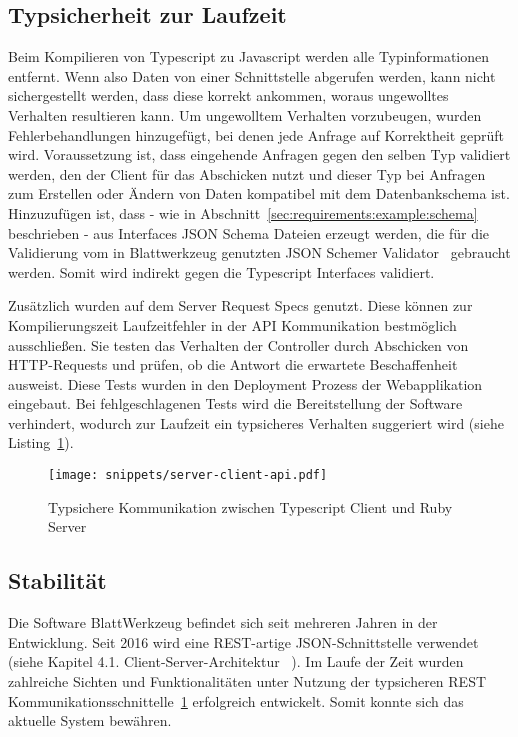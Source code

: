 \subsection{Typsicherheit zur Laufzeit}
\label{sec:requirements:pros:typesafe-runtime}
Beim Kompilieren von Typescript zu Javascript werden alle Typinformationen entfernt.
Wenn also Daten von einer Schnittstelle abgerufen werden, kann nicht sichergestellt werden, dass diese korrekt ankommen, woraus
ungewolltes Verhalten resultieren kann.
Um ungewolltem Verhalten vorzubeugen, wurden Fehlerbehandlungen hinzugefügt, bei denen jede Anfrage auf Korrektheit geprüft wird.
Voraussetzung ist, dass eingehende Anfragen gegen den selben Typ validiert werden,
den der Client für das Abschicken nutzt und dieser Typ bei Anfragen zum Erstellen oder Ändern von Daten kompatibel mit dem Datenbankschema ist.
Hinzuzufügen ist, dass - wie in Abschnitt~\ref{sec:requirements:example:schema} beschrieben - aus Interfaces JSON Schema Dateien erzeugt werden,
die für die Validierung vom in Blattwerkzeug genutzten JSON Schemer Validator~\cite{json-schemer} gebraucht werden. Somit wird indirekt gegen die Typescript Interfaces validiert.

Zusätzlich wurden auf dem Server Request Specs genutzt.
Diese können zur Kompilierungszeit Laufzeitfehler in der API Kommunikation bestmöglich ausschließen.
Sie testen das Verhalten der Controller durch Abschicken von HTTP-Requests und prüfen, ob die Antwort die erwartete Beschaffenheit ausweist. 
Diese Tests wurden in den Deployment Prozess der Webapplikation eingebaut. Bei fehlgeschlagenen Tests wird die Bereitstellung der Software
verhindert, wodurch zur Laufzeit ein typsicheres Verhalten suggeriert wird (siehe Listing~\ref{req:typesafe:server-client-short}).

\begin{figure}[h!]
    \centering
    \texttt{[image: snippets/server-client-api.pdf]}
    \caption{Typsichere Kommunikation zwischen Typescript Client und Ruby Server}
    \label{req:typesafe:server-client-short}
\end{figure}

\subsection{Stabilität}
\label{sec:requirements:pros:stable}
Die Software BlattWerkzeug befindet sich seit mehreren Jahren in der Entwicklung. Seit 2016 wird
eine REST-artige JSON-Schnittstelle verwendet (siehe Kapitel 4.1. Client-Server-Architektur ~\cite{riemer2016}).
Im Laufe der Zeit wurden zahlreiche Sichten und Funktionalitäten unter Nutzung der typsicheren REST Kommunikationsschnittelle~\ref{req:typesafe:server-client-short} erfolgreich entwickelt.
Somit konnte sich das aktuelle System bewähren.


